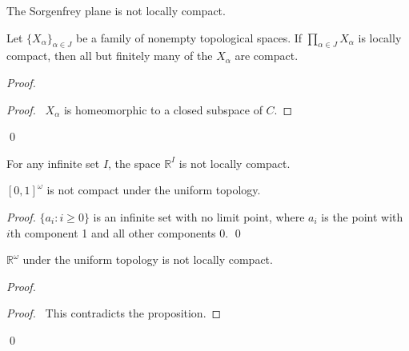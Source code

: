 \begin{cor}
The Sorgenfrey plane is not locally compact.
\end{cor}

  \begin{prop}
 Let $\{X_\alpha\}_{\alpha \in J}$ be a family of nonempty topological
spaces. If    $\prod_{\alpha \in J} X_\alpha$ is locally compact, then all but
finitely many of the $X_\alpha$ are compact.
\end{prop}

\begin{proof}
\pf
{}
\begin{proof}
  \pf\ $X_\alpha$ is homeomorphic to a closed subspace of $C$.
\end{proof}
\qed
\end{proof}

\begin{cor}
For any infinite set $I$, the space $\mathbb{R}^I$ is not locally compact.
\end{cor}

\begin{prop}
 $[0,1]^\omega$ is not compact under the uniform topology.
\end{prop}

\begin{proof}
 \pf $\{ a_i : i \geq 0 \}$ is an infinite set with no limit point, where
$a_i$ is the point with $i$th component 1 and all other components 0. \qed
\end{proof}

\begin{cor}
 $\mathbb{R}^\omega$ under the uniform topology is not locally compact.
\end{cor}

\begin{proof}
\pf
{}
\qedstep
\begin{proof}
  \pf\ This contradicts the proposition.
\end{proof}
\qed
\end{proof}

